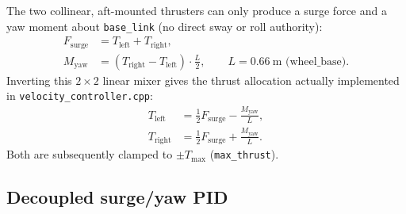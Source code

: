 The two collinear, aft-mounted thrusters can only produce a surge force and a yaw moment about \texttt{base\_link} (no direct sway or roll authority):
\begin{align}
F_{\text{surge}} &= T_{\text{left}} + T_{\text{right}}, \\
M_{\text{yaw}} &= (T_{\text{right}} - T_{\text{left}})\cdot \frac{L}{2}, \qquad L = 0.66\ \text{m (wheel\_base)}.
\end{align}
Inverting this $2\times2$ linear mixer gives the thrust allocation actually implemented in \texttt{velocity\_controller.cpp}:
\begin{align}
T_{\text{left}}  &= \tfrac{1}{2}F_{\text{surge}} - \frac{M_{\text{yaw}}}{L}, \label{eq:mixL}\\
T_{\text{right}} &= \tfrac{1}{2}F_{\text{surge}} + \frac{M_{\text{yaw}}}{L}. \label{eq:mixR}
\end{align}
Both are subsequently clamped to $\pm T_{\max}$ (\texttt{max\_thrust}).

\subsection{Decoupled surge/yaw PID}
\label{sec:pid}

